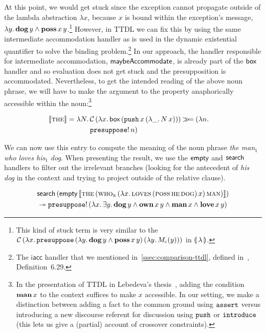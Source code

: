 At this point, we would get stuck since the exception cannot propagate
outside of the lambda abstraction $\lambda x$, because $x$ is bound within
the exception's message,
$\lambda y.\, \textbf{dog}\,y \land \textbf{poss}\,x\,y$.\footnote{This
  kind of stuck term is very similar to the
  $\mathcal{C}\,(\lambda x.\, \mathtt{presuppose}\,(\lambda y.\, \textbf{dog}\,y \land
          \textbf{poss}\,x\,y)\,(\lambda y.\, M_{\mathrm{c}}(y)))$ in
  ${\llparenthesis \, \lambda \, \rrparenthesis}$.} However, in TTDL we can fix this by using the same intermediate
accommodation handler as is used in the dynamic existential quantifier to
solve the binding problem.\footnote{The $\textsf{iacc}$ handler that we
  mentioned in~\ref{ssec:comparison-ttdl}, defined
  in~\cite{lebedeva2012expression}, Definition~6.29.} In our approach, the
handler responsible for intermediate accommodation, $\textsf{maybeAccommodate}$, is
already part of the $\textsf{box}$ handler and so evaluation does not get stuck and
the presupposition is accommodated. Nevertheless, to get the intended
reading of the above noun phrase, we will have to make the argument to the
property anaphorically accessible within the noun:\footnote{In the
  presentation of TTDL in Lebedeva's thesis~\cite{lebedeva2012expression},
  adding the condition $\textbf{man}\,x$ to the context suffices to make
  $x$ accessible. In our setting, we make a distinction between adding a
  fact to the common ground using $\mathtt{assert}$ versus introducing a new
  discourse referent for discussion using $\mathtt{push}$ or $\mathtt{introduce}$
  (this lets us give a (partial) account of crossover constraints).}

\begin{align*}
  \llbracket \textsc{the} \rrbracket &= \lambda N.\, \begin{aligned}[t]
      &\mathcal{C}\,(\lambda x.\, \textsf{box}\,(\mathtt{push}\,x\,(\lambda \_.\, N\,x))) \mathbin{\gg\!=} (\lambda n.\,  \\
      &\mathtt{presuppose}!\,n)
    \end{aligned}
\end{align*}

We can now use this entry to compute the meaning of the noun phrase
\emph{the man$_1$ who loves his$_1$ dog}. When presenting the result, we
use the $\textsf{empty}$ and $\textsf{search}$ handlers to filter out the irrelevant
branches (looking for the antecedent of \emph{his dog} in the context and
trying to project outside of the relative clause).

\begin{align*}
& \textsf{search}\,(\textsf{empty}\,\llbracket \textsc{the}\,(\textsc{who}_{\textsc{r}}\,(\lambda x.\, \textsc{loves}\,(\textsc{poss}\,\textsc{he}\,\textsc{dog})\,x)\,\textsc{man}) \rrbracket) \\
& \twoheadrightarrow \mathtt{presuppose}!\,(\lambda x.\, \exists y.\, \textbf{dog}\,y \land
  \textbf{own}\,x\,y \land \textbf{man}\,x \land \textbf{love}\,x\,y)
\end{align*}

